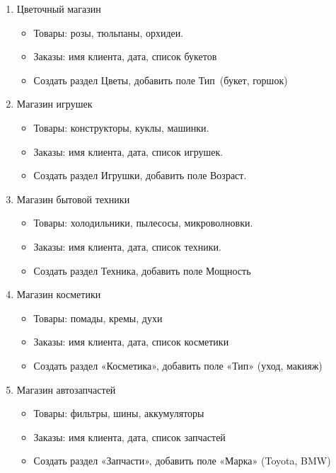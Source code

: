 \documentclass[12pt]{article}
\begin{document}
\begin{enumerate}
	\item Цветочный магазин
	      \begin{itemize}
		      \item Товары: розы, тюльпаны, орхидеи.
		      \item Заказы: имя клиента, дата, список букетов
		      \item Создать раздел \guillemotleft Цветы\guillemotright , добавить поле \guillemotleft Тип\guillemotright \ (букет, горшок)
	      \end{itemize}

	      \newpage

	\item Магазин игрушек
	      \begin{itemize}
		      \item Товары: конструкторы, куклы, машинки.
		      \item Заказы: имя клиента, дата, список игрушек.
		      \item Создать раздел \guillemotleft Игрушки\guillemotright, добавить поле \guillemotleft Возраст\guillemotright.
	      \end{itemize}

	\item Магазин бытовой техники
	      \begin{itemize}
		      \item Товары: холодильники, пылесосы, микроволновки.
		      \item Заказы: имя клиента, дата, список техники.
		      \item Создать раздел \guillemotleft Техника\guillemotright, добавить поле \guillemotleft Мощность\guillemotright
	      \end{itemize}

	\item Магазин косметики
	      \begin{itemize}
		      \item Товары: помады, кремы, духи
		      \item Заказы: имя клиента, дата, список косметики
		      \item Создать раздел «Косметика», добавить поле «Тип» (уход, макияж)
	      \end{itemize}

	\item Магазин автозапчастей
	      \begin{itemize}
		      \item Товары: фильтры, шины, аккумуляторы
		      \item Заказы: имя клиента, дата, список запчастей
		      \item Создать раздел «Запчасти», добавить поле «Марка» (Toyota, BMW)
	      \end{itemize}


\end{enumerate}
\end{document}
